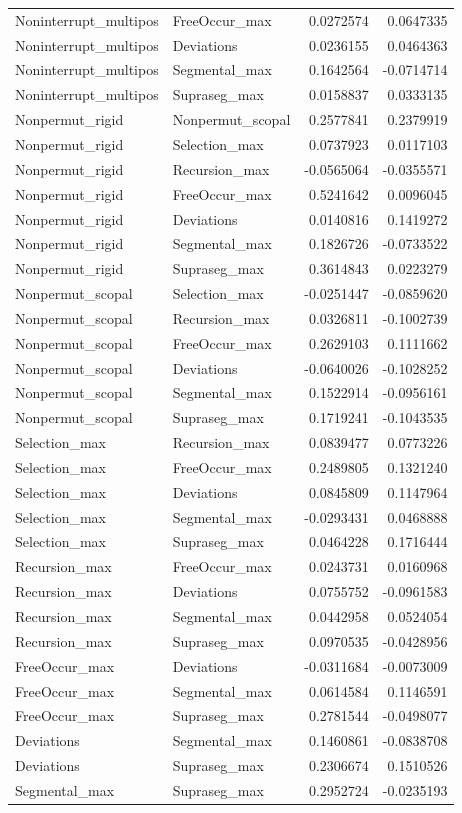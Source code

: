 \documentclass[
]{article}
\begin{document}
\begin{longtable}[]{@{}llrr@{}}
Noninterrupt\_multipos & FreeOccur\_max & 0.0272574 & 0.0647335 \\
Noninterrupt\_multipos & Deviations & 0.0236155 & 0.0464363 \\
Noninterrupt\_multipos & Segmental\_max & 0.1642564 & -0.0714714 \\
Noninterrupt\_multipos & Supraseg\_max & 0.0158837 & 0.0333135 \\
Nonpermut\_rigid & Nonpermut\_scopal & 0.2577841 & 0.2379919 \\
Nonpermut\_rigid & Selection\_max & 0.0737923 & 0.0117103 \\
Nonpermut\_rigid & Recursion\_max & -0.0565064 & -0.0355571 \\
Nonpermut\_rigid & FreeOccur\_max & 0.5241642 & 0.0096045 \\
Nonpermut\_rigid & Deviations & 0.0140816 & 0.1419272 \\
Nonpermut\_rigid & Segmental\_max & 0.1826726 & -0.0733522 \\
Nonpermut\_rigid & Supraseg\_max & 0.3614843 & 0.0223279 \\
Nonpermut\_scopal & Selection\_max & -0.0251447 & -0.0859620 \\
Nonpermut\_scopal & Recursion\_max & 0.0326811 & -0.1002739 \\
Nonpermut\_scopal & FreeOccur\_max & 0.2629103 & 0.1111662 \\
Nonpermut\_scopal & Deviations & -0.0640026 & -0.1028252 \\
Nonpermut\_scopal & Segmental\_max & 0.1522914 & -0.0956161 \\
Nonpermut\_scopal & Supraseg\_max & 0.1719241 & -0.1043535 \\
Selection\_max & Recursion\_max & 0.0839477 & 0.0773226 \\
Selection\_max & FreeOccur\_max & 0.2489805 & 0.1321240 \\
Selection\_max & Deviations & 0.0845809 & 0.1147964 \\
Selection\_max & Segmental\_max & -0.0293431 & 0.0468888 \\
Selection\_max & Supraseg\_max & 0.0464228 & 0.1716444 \\
Recursion\_max & FreeOccur\_max & 0.0243731 & 0.0160968 \\
Recursion\_max & Deviations & 0.0755752 & -0.0961583 \\
Recursion\_max & Segmental\_max & 0.0442958 & 0.0524054 \\
Recursion\_max & Supraseg\_max & 0.0970535 & -0.0428956 \\
FreeOccur\_max & Deviations & -0.0311684 & -0.0073009 \\
FreeOccur\_max & Segmental\_max & 0.0614584 & 0.1146591 \\
FreeOccur\_max & Supraseg\_max & 0.2781544 & -0.0498077 \\
Deviations & Segmental\_max & 0.1460861 & -0.0838708 \\
Deviations & Supraseg\_max & 0.2306674 & 0.1510526 \\
Segmental\_max & Supraseg\_max & 0.2952724 & -0.0235193 \\
\end{longtable}
\end{document}
